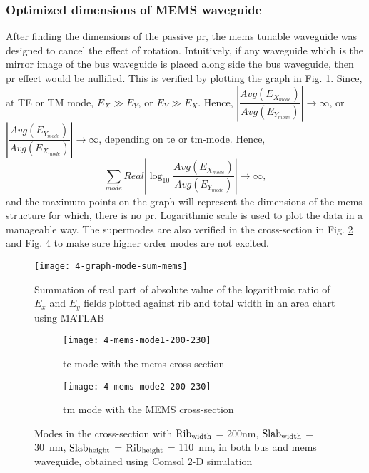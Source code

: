 \documentclass[../report.tex]{subfiles}
\begin{document}
\subsubsection{Optimized dimensions of MEMS waveguide}
After finding the dimensions of the passive \gls{pr}, the \gls{mems} tunable waveguide was designed to cancel the effect of rotation. Intuitively, if any waveguide which is the mirror image of the bus waveguide is placed along side the bus waveguide, then \gls{pr} effect would be nullified. This is verified by plotting the graph in Fig. \ref{fig:4_graph_mode_sum_mems}. Since, at TE or TM mode, $E_X \gg E_Y$, or $E_Y \gg E_X$. Hence, $\left|\dfrac {Avg(E_{X_{mode}})} {Avg(E_{Y_{mode}})}\right| \rightarrow \infty$, or $\left|\dfrac {Avg(E_{Y_{mode}})} {Avg(E_{X_{mode}})}\right| \rightarrow \infty$, depending on \gls{te} or \gls{tm}-mode.
Hence, 
\begin{equation}\label{eq:mems_dim_eq}
\sum _{mode}Real\left| \log _{10}\dfrac {Avg(E_{X_{mode}})} {Avg(E_{Y_{mode}})}\right| \rightarrow \infty,
\end{equation}
and the maximum points on the graph will represent the dimensions of the \gls{mems} structure for which, there is no \gls{pr}. Logarithmic scale is used to plot the data in a manageable way. The supermodes are also verified in the cross-section in Fig. \ref{fig:4_mems_mode1_200_230} and Fig. \ref{fig:4_mems_mode2_200_230} to make sure higher order modes are not excited.

\begin{figure}[H] %
	\centering
	\texttt{[image: 4-graph-mode-sum-mems]}
	\caption{Summation of real part of absolute value of the logarithmic ratio of $E_x$ and $E_y$ fields plotted against rib and total width in an area chart using MATLAB}
	\label{fig:4_graph_mode_sum_mems}
\end{figure}
		
\begin{figure}[H] %
	\begin{subfigure}[t]{0.45\textwidth}
		\texttt{[image: 4-mems-mode1-200-230]}
		\caption{\gls{te} mode with the \gls{mems} cross-section}
		\label{fig:4_mems_mode1_200_230}
	\end{subfigure}
	\hfill
	\begin{subfigure}[t]{0.45\textwidth}
		\texttt{[image: 4-mems-mode2-200-230]}
		\caption{\gls{tm} mode with the MEMS cross-section}
		\label{fig:4_mems_mode2_200_230}
	\end{subfigure}
	\caption{Modes in the cross-section with $\mathrm{Rib_{width}}$ = 200nm, $\mathrm{Slab_{width}}$ = \SI{30}{\nano \meter}, $\mathrm{Slab_{height}}$ = $\mathrm{Rib_{height}}$ = \SI{110}{\nano \meter}, in both bus and \gls{mems} waveguide, obtained using Comsol 2-D simulation}
\end{figure}
\end{document}
